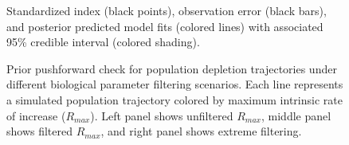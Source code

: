 \documentclass[
  11pt,
]{SCreport}
\begin{document}
\begin{figure}[H]


\caption{\label{fig-idx-fit}Standardized index (black points),
observation error (black bars), and posterior predicted model fits
(colored lines) with associated 95\% credible interval (colored
shading).}

\end{figure}%

\newpage

\begin{figure}[H]


\caption{\label{fig-pushforward}Prior pushforward check for population
depletion trajectories under different biological parameter filtering
scenarios. Each line represents a simulated population trajectory
colored by maximum intrinsic rate of increase (\(R_{max}\)). Left panel
shows unfiltered \(R_{max}\), middle panel shows filtered \(R_{max}\),
and right panel shows extreme filtering.}

\end{figure}%
\end{document}
